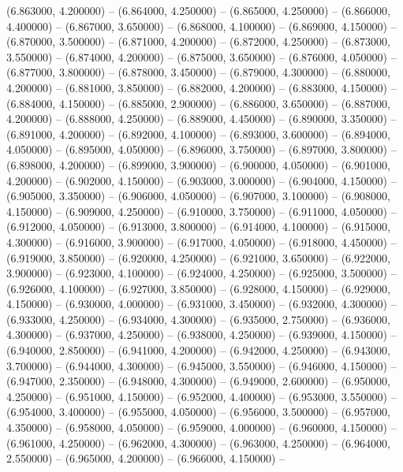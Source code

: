 (6.863000, 4.200000) -- 
(6.864000, 4.250000) -- 
(6.865000, 4.250000) -- 
(6.866000, 4.400000) -- 
(6.867000, 3.650000) -- 
(6.868000, 4.100000) -- 
(6.869000, 4.150000) -- 
(6.870000, 3.500000) -- 
(6.871000, 4.200000) -- 
(6.872000, 4.250000) -- 
(6.873000, 3.550000) -- 
(6.874000, 4.200000) -- 
(6.875000, 3.650000) -- 
(6.876000, 4.050000) -- 
(6.877000, 3.800000) -- 
(6.878000, 3.450000) -- 
(6.879000, 4.300000) -- 
(6.880000, 4.200000) -- 
(6.881000, 3.850000) -- 
(6.882000, 4.200000) -- 
(6.883000, 4.150000) -- 
(6.884000, 4.150000) -- 
(6.885000, 2.900000) -- 
(6.886000, 3.650000) -- 
(6.887000, 4.200000) -- 
(6.888000, 4.250000) -- 
(6.889000, 4.450000) -- 
(6.890000, 3.350000) -- 
(6.891000, 4.200000) -- 
(6.892000, 4.100000) -- 
(6.893000, 3.600000) -- 
(6.894000, 4.050000) -- 
(6.895000, 4.050000) -- 
(6.896000, 3.750000) -- 
(6.897000, 3.800000) -- 
(6.898000, 4.200000) -- 
(6.899000, 3.900000) -- 
(6.900000, 4.050000) -- 
(6.901000, 4.200000) -- 
(6.902000, 4.150000) -- 
(6.903000, 3.000000) -- 
(6.904000, 4.150000) -- 
(6.905000, 3.350000) -- 
(6.906000, 4.050000) -- 
(6.907000, 3.100000) -- 
(6.908000, 4.150000) -- 
(6.909000, 4.250000) -- 
(6.910000, 3.750000) -- 
(6.911000, 4.050000) -- 
(6.912000, 4.050000) -- 
(6.913000, 3.800000) -- 
(6.914000, 4.100000) -- 
(6.915000, 4.300000) -- 
(6.916000, 3.900000) -- 
(6.917000, 4.050000) -- 
(6.918000, 4.450000) -- 
(6.919000, 3.850000) -- 
(6.920000, 4.250000) -- 
(6.921000, 3.650000) -- 
(6.922000, 3.900000) -- 
(6.923000, 4.100000) -- 
(6.924000, 4.250000) -- 
(6.925000, 3.500000) -- 
(6.926000, 4.100000) -- 
(6.927000, 3.850000) -- 
(6.928000, 4.150000) -- 
(6.929000, 4.150000) -- 
(6.930000, 4.000000) -- 
(6.931000, 3.450000) -- 
(6.932000, 4.300000) -- 
(6.933000, 4.250000) -- 
(6.934000, 4.300000) -- 
(6.935000, 2.750000) -- 
(6.936000, 4.300000) -- 
(6.937000, 4.250000) -- 
(6.938000, 4.250000) -- 
(6.939000, 4.150000) -- 
(6.940000, 2.850000) -- 
(6.941000, 4.200000) -- 
(6.942000, 4.250000) -- 
(6.943000, 3.700000) -- 
(6.944000, 4.300000) -- 
(6.945000, 3.550000) -- 
(6.946000, 4.150000) -- 
(6.947000, 2.350000) -- 
(6.948000, 4.300000) -- 
(6.949000, 2.600000) -- 
(6.950000, 4.250000) -- 
(6.951000, 4.150000) -- 
(6.952000, 4.400000) -- 
(6.953000, 3.550000) -- 
(6.954000, 3.400000) -- 
(6.955000, 4.050000) -- 
(6.956000, 3.500000) -- 
(6.957000, 4.350000) -- 
(6.958000, 4.050000) -- 
(6.959000, 4.000000) -- 
(6.960000, 4.150000) -- 
(6.961000, 4.250000) -- 
(6.962000, 4.300000) -- 
(6.963000, 4.250000) -- 
(6.964000, 2.550000) -- 
(6.965000, 4.200000) -- 
(6.966000, 4.150000) -- 
